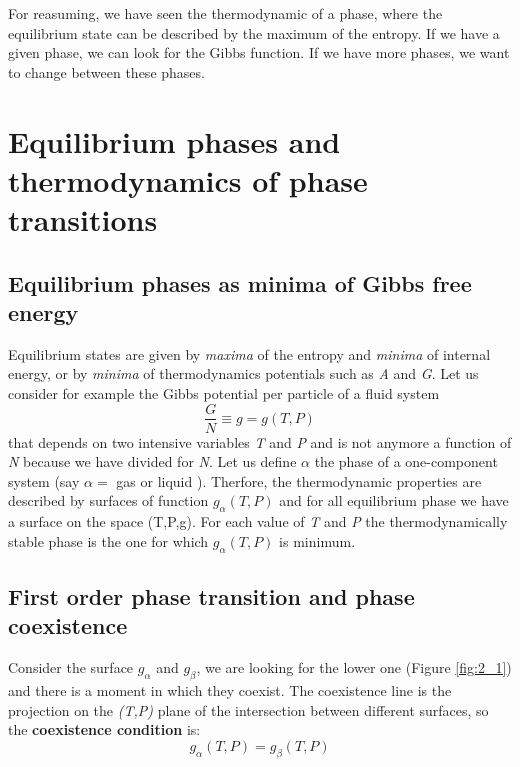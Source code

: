 \documentclass[../main/main.tex]{subfiles}
\begin{document}
For reasuming, we have seen the thermodynamic of a phase, where the equilibrium state can be described by the maximum of the entropy. If we have a given phase, we can look for the Gibbs function. If we have more phases, we want to change between these phases.















\chapter{Equilibrium phases and thermodynamics of phase transitions}

\section{Equilibrium phases as minima of Gibbs free energy}

Equilibrium states are given by \emph{maxima} of the entropy and \emph{minima} of internal energy, or by \emph{minima} of thermodynamics potentials such as \emph{A} and \emph{G}.
Let us consider for example the Gibbs potential per particle of a fluid system
\begin{equation}
  \frac{G}{N} \equiv g = g (T,P)
  \label{eq:}
\end{equation}
  that depends on two intensive variables \emph{T} and \emph{P} and is not anymore a function of \emph{N} because we have divided for \emph{N}.
  Let us define \( \alpha  \) the phase of a one-component system (say \( \alpha = \) gas or liquid ). Therfore, the thermodynamic properties are described by surfaces of function \( g_\alpha (T,P) \) and for all equilibrium phase we have a surface on the space (T,P,g). For each value of \emph{T} and \emph{P} the thermodynamically stable phase is the one for which \( g_ \alpha (T,P) \) is minimum.

\section{First order phase transition and phase coexistence}

Consider the surface \( g_ \alpha  \) and \( g_ \beta  \), we are looking for the lower one (Figure \ref{fig:2_1}) and there is a moment in which they coexist.
The coexistence line is the projection on the \emph{(T,P)} plane of the intersection between different surfaces, so the \textbf{coexistence condition} is:
\begin{equation}
g_ \alpha(T,P) = g_ \beta(T,P)
  \label{eq:}
\end{equation}
\end{document}
